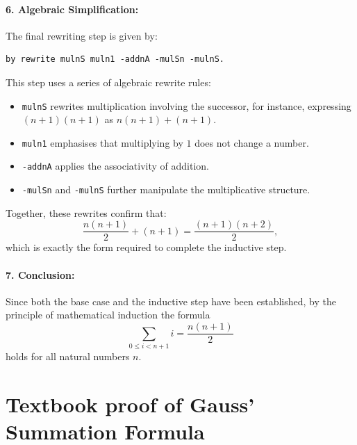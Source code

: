 \documentclass[letterpaper]{article}
\begin{document}
\paragraph{6. Algebraic Simplification:}
The final rewriting step is given by:
\begin{verbatim}
by rewrite mulnS muln1 -addnA -mulSn -mulnS.
\end{verbatim}
This step uses a series of algebraic rewrite rules:
\begin{itemize}
    \item \texttt{mulnS} rewrites multiplication involving the successor, for instance, expressing \((n+1)(n+1)\) as \( n(n+1) + (n+1) \).
    \item \texttt{muln1} emphasises that multiplying by \( 1 \) does not change a number.
    \item \texttt{-addnA} applies the associativity of addition.
    \item \texttt{-mulSn} and \texttt{-mulnS} further manipulate the multiplicative structure.
\end{itemize}
Together, these rewrites confirm that:
\[
\frac{n(n+1)}{2} + (n+1) = \frac{(n+1)(n+2)}{2},
\]
which is exactly the form required to complete the inductive step.

\paragraph{7. Conclusion:}
Since both the base case and the inductive step have been established, by the principle of mathematical induction the formula
\[
\sum_{0 \le i < n+1} i = \frac{n(n+1)}{2}
\]
holds for all natural numbers \( n \).


\pagebreak
\section{Textbook proof of Gauss' Summation Formula}
\label{sec:textbookproof}
\end{document}
